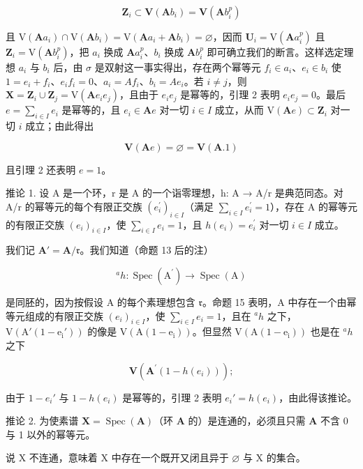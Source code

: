 \[
\mathbf {Z} _ {i} \subset \mathbf {V} (\mathbf {A} b _ {i}) = \mathbf {V} (\mathbf {A} b _ {i} ^ {p})
\]

且 \(\mathrm{V}(\mathbf{A}a_i)\cap \mathrm{V}(\mathbf{A}b_i) = \mathrm{V}(\mathbf{A}a_i + \mathbf{A}b_i) = \varnothing\)，因而 \(\mathbf{U}_i = \mathrm{V}(\mathbf{A}a_i^p)\) 且 \(\mathbf{Z}_i = \mathrm{V}(\mathbf{A}b_i^p)\)，把 \(a_i\) 换成 \(\mathbf{A}a_i^p\)、\(b_i\) 换成 \(\mathbf{A}b_i^p\) 即可确立我们的断言。这样选定理想 \(a_i\) 与 \(b_i\) 后，由 \(\sigma\) 是双射这一事实得出，存在两个幂等元 \(f_i\in a_i\)、\(e_i\in b_i\) 使 \(1 = e_i + f_i\)、\(e_i f_i = 0\)、\(a_i = Af_i\)、\(b_i = Ae_i\)。若 \(i\neq j\)，则 \(\mathbf{X} = \mathbf{Z}_i\cup \mathbf{Z}_j = \mathrm{V}(\mathbf{A}e_i e_j)\)，且由于 \(e_i e_j\) 是幂等的，引理 2 表明 \(e_i e_j = 0\)。最后 \(e = \sum_{i\in I}e_i\) 是幂等的，且 \(e_i\in \mathbf{A}e\) 对一切 \(i\in I\) 成立，从而 \(\mathrm{V}(\mathbf{A}e)\subset \mathbf{Z}_i\) 对一切 \(i\) 成立；由此得出

\[
\mathbf {V} (\mathbf {A} e) = \varnothing = \mathbf {V} (\mathbf {A}. 1)
\]

且引理 2 还表明 \(e = 1\)。

推论 1. 设 A 是一个环，r 是 A 的一个诣零理想，h: A → A/r 是典范同态。对 A/r 的幂等元的每个有限正交族 \((e_{i}^{\prime})_{i\in I}\)（满足 \(\sum_{i\in I} e_{i}^{\prime}=1\)），存在 A 的幂等元的有限正交族 \((e_{i})_{i\in I}\)，使 \(\sum_{i\in I} e_{i}=1\)，且 \(h(e_{i})=e_{i}^{\prime}\) 对一切 \(i\in I\) 成立。

我们记 \(\mathbf{A}' = \mathbf{A} / \mathfrak{r}\)。我们知道（命题 13 后的注）

\[
^ {a} h \colon \operatorname{Spec} (\mathrm{A} ^ {\prime}) \rightarrow \operatorname{Spec} (\mathrm{A})
\]

是同胚的，因为按假设 A 的每个素理想包含 \(\mathfrak{r}\)。命题 15 表明，A 中存在一个由幂等元组成的有限正交族 \((e_i)_{i\in I}\)，使 \(\sum_{i\in I}e_i = 1\)，且在 \(^ah\) 之下，\(\mathrm{V(A'(1 - e_i'))}\) 的像是 \(\mathrm{V(A(1 - e_i))}\)。但显然 \(\mathrm{V(A(1 - e_i))}\) 也是在 \(^ah\) 之下

\[
\mathbf {V} (\mathbf {A} ^ {\prime} (1 - h (e _ {i})))  ;
\]

由于 \(1 - e_i'\) 与 \(1 - h(e_i)\) 是幂等的，引理 2 表明 \(e_i' = h(e_i)\)，由此得该推论。

推论 2. 为使素谱 \(\mathbf{X} = \operatorname{Spec}(\mathbf{A})\)（环 \(\mathbf{A}\) 的）是连通的，必须且只需 \(\mathbf{A}\) 不含 0 与 1 以外的幂等元。

说 X 不连通，意味着 X 中存在一个既开又闭且异于 \(\varnothing\) 与 X 的集合。

